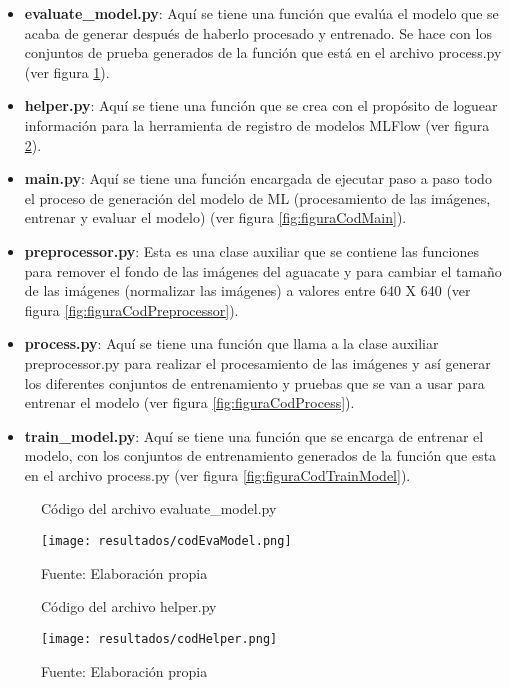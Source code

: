 \begin{itemize}
    \item \textbf{evaluate\_model.py}: Aquí se tiene una función que evalúa el modelo que se acaba de generar después de haberlo procesado y entrenado. Se hace con los conjuntos de prueba generados de la función que está en el archivo process.py (ver figura \ref{fig:figuraCodEvaModel}).
    \item \textbf{helper.py}: Aquí se tiene una función que se crea con el propósito de loguear información para la herramienta de registro de modelos MLFlow (ver figura \ref{fig:figuraCodHelper}).
    \item \textbf{main.py}: Aquí se tiene una función encargada de ejecutar paso a paso todo el proceso de generación del modelo de ML (procesamiento de las imágenes, entrenar y evaluar el modelo) (ver figura \ref{fig:figuraCodMain}).
    \item \textbf{preprocessor.py}: Esta es una clase auxiliar que se contiene las funciones para remover el fondo de las imágenes del aguacate y para cambiar el tamaño de las imágenes (normalizar las imágenes) a valores entre 640 X 640 (ver figura \ref{fig:figuraCodPreprocessor}).
    \item \textbf{process.py}: Aquí se tiene una función que llama a la clase auxiliar preprocessor.py para realizar el procesamiento de las imágenes y así generar los diferentes conjuntos de entrenamiento y pruebas que se van a usar para entrenar el modelo (ver figura \ref{fig:figuraCodProcess}).
    \item \textbf{train\_model.py}: Aquí se tiene una función que se encarga de entrenar el modelo, con los conjuntos de entrenamiento generados de la función que esta en el archivo process.py (ver figura \ref{fig:figuraCodTrainModel}).
\end{itemize}

\newpage

\begin{figure}[h]
\centering
\caption{Código del archivo evaluate\_model.py}
\texttt{[image: resultados/codEvaModel.png]}
\caption*{\footnotesize Fuente: Elaboración propia}
\label{fig:figuraCodEvaModel}
\end{figure}

\newpage

\begin{figure}[h]
\centering
\caption{Código del archivo helper.py}
\texttt{[image: resultados/codHelper.png]}
\caption*{\footnotesize Fuente: Elaboración propia}
\label{fig:figuraCodHelper}
\end{figure}

